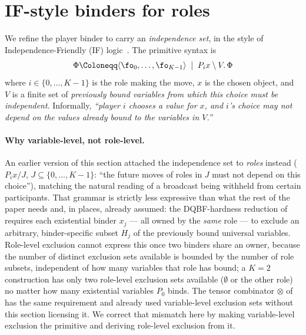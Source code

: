 
\section{IF-style binders for roles}
\label{subsec:if-binders}
We refine the player binder to carry an \emph{independence set}, in the style of
Independence-Friendly (IF) logic~\cite{HintikkaSandu1989}. The primitive
syntax is
\[
  \Phi \Coloneqq
  \langle \fo_0,\dots,\fo_{K-1} \rangle
  \;\mid\;
  P_i x \setminus V.\,\Phi
\]
where $i \in \{0,\dots,K-1\}$ is the role making the move, $x$ is the chosen
object, and $V$ is a finite set of \emph{previously bound variables from
which this choice must be independent}. Informally, \emph{``player $i$
chooses a value for $x$, and $i$'s choice may not depend on the values
already bound to the variables in $V$.''}

\paragraph{Why variable-level, not role-level.}
An earlier version of this section attached the independence set to
\emph{roles} instead ($P_i x / J$, $J \subseteq \{0,\dots,K-1\}$: ``the
future moves of roles in $J$ must not depend on this choice''), matching the
natural reading of a broadcast being withheld from certain participants.
That grammar is strictly less expressive than what the rest of the paper
needs and, in places, already assumed: the DQBF-hardness reduction of
 requires each existential binder $x_j$ --- all owned
by the \emph{same} role --- to exclude an arbitrary, binder-specific subset
$H_j$ of the previously bound universal variables. Role-level exclusion
cannot express this once two binders share an owner, because the number of
distinct exclusion sets available is bounded by the number of role subsets,
independent of how many variables that role has bound; a $K=2$ construction
has only two role-level exclusion sets available ($\emptyset$ or the other
role) no matter how many existential variables $P_0$ binds. The tensor
combinator $\otimes$ of  has the same
requirement and already used variable-level exclusion sets without this
section licensing it. We correct that mismatch here by making variable-level
exclusion the primitive and deriving role-level exclusion from it.

